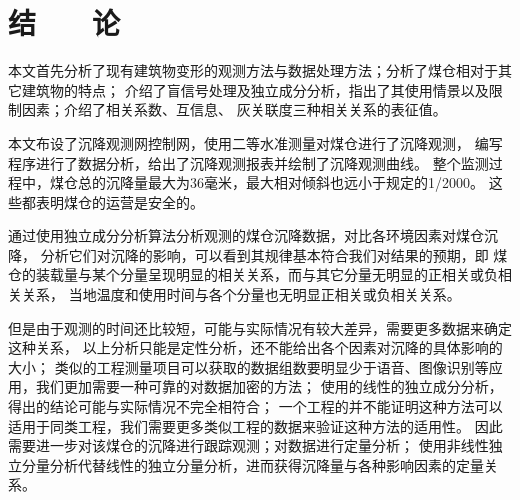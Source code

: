 
\chapter*{\hfill 结　　论 \hfill}

本文首先分析了现有建筑物变形的观测方法与数据处理方法；分析了煤仓相对于其它建筑物的特点；
介绍了盲信号处理及独立成分分析，指出了其使用情景以及限制因素；介绍了相关系数、互信息、
灰关联度三种相关关系的表征值。

本文布设了沉降观测网控制网，使用二等水准测量对煤仓进行了沉降观测，
编写程序进行了数据分析，给出了沉降观测报表并绘制了沉降观测曲线。
整个监测过程中，煤仓总的沉降量最大为36毫米，最大相对倾斜也远小于规定的1/2000。
这些都表明煤仓的运营是安全的。

通过使用独立成分分析算法分析观测的煤仓沉降数据，对比各环境因素对煤仓沉降，
分析它们对沉降的影响，可以看到其规律基本符合我们对结果的预期，即
煤仓的装载量与某个分量呈现明显的相关关系，而与其它分量无明显的正相关或负相关关系，
当地温度和使用时间与各个分量也无明显正相关或负相关关系。

但是由于观测的时间还比较短，可能与实际情况有较大差异，需要更多数据来确定这种关系，
以上分析只能是定性分析，还不能给出各个因素对沉降的具体影响的大小；
类似的工程测量项目可以获取的数据组数要明显少于语音、图像识别等应用，我们更加需要一种可靠的对数据加密的方法；
使用的线性的独立成分分析，得出的结论可能与实际情况不完全相符合；
一个工程的并不能证明这种方法可以适用于同类工程，我们需要更多类似工程的数据来验证这种方法的适用性。
因此需要进一步对该煤仓的沉降进行跟踪观测；对数据进行定量分析；
使用非线性独立分量分析代替线性的独立分量分析，进而获得沉降量与各种影响因素的定量关系。
